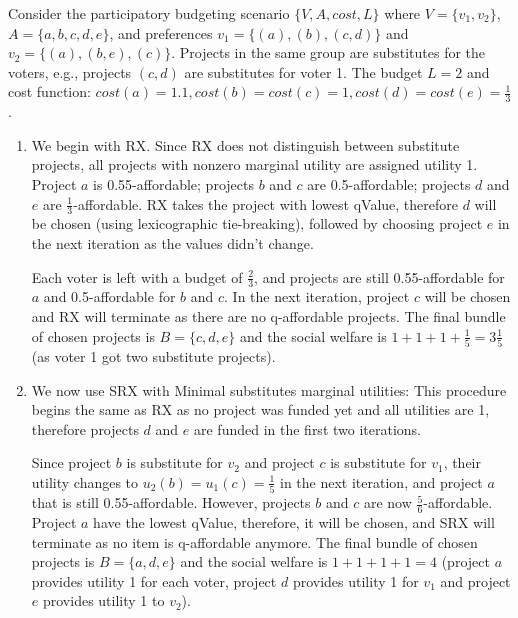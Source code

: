\documentclass[runningheads]{llncs}
\begin{document}
\begin{example}


Consider the 
participatory budgeting scenario $\{V,A,cost,L\}$  where $V=\{v_1,v_2\}$, $A=\{a,b,c,d,e\}$, and preferences $v_1=\{(a),(b),(c,d)\}$ and  $v_2=\{(a),(b,e),(c)\}$. Projects in the same group are  substitutes for the voters, e.g., projects $(c,d)$ are substitutes for voter 1. The budget $L=2$ and cost function: $cost(a)=1.1,cost(b)=cost(c)=1, cost(d)=cost(e)=\frac{1}{3}$. 


\begin{enumerate}
    \item  We begin with RX. Since  RX does not distinguish between substitute projects,   all projects with nonzero marginal utility  are assigned  utility 1.
    Project $a$ is 0.55-affordable; projects $b$ and $c$ are 0.5-affordable; projects $d$ and $e$ are $\frac{1}{3}$-affordable. RX takes the project with lowest qValue, therefore $d$ will be chosen (using lexicographic tie-breaking), followed by choosing project $e$ in the next iteration as the values didn't change.  
    
    Each voter is  left with a budget of $\frac{2}{3}$, and  projects are still 0.55-affordable for $a$ and 0.5-affordable for $b$ and $c$. In the next iteration, project $c$ will be chosen and RX will terminate as there are no  q-affordable projects. The final bundle of chosen projects is  $B=\{c,d,e\}$ and the social welfare is $1+1+1+\frac{1}{5}=3\frac{1}{5}$ (as voter 1 got two substitute projects). 
    
    \item We now use SRX  with Minimal substitutes marginal utilities: This procedure begins  the same as RX as no project was funded yet and all utilities are 1, therefore   projects $d$ and $e$ are funded in the first two iterations. 
    
    Since  project $b$ is substitute for $v_2$ and project $c$ is substitute for $v_1$, their utility changes  to $u_2(b)=u_1(c)=\frac{1}{5}$ in the next iteration, and project $a$ that is  still 0.55-affordable. However, projects $b$ and $c$ are now $\frac{5}{6}$-affordable. Project $a$ have the lowest qValue, therefore, it will be chosen, and SRX will terminate as no item is q-affordable anymore.
    The final bundle of chosen projects is $B=\{a,d,e\}$ and the social welfare is $1+1+1+1=4$ (project $a$ provides utility 1 for each voter, project $d$ provides utility 1 for $v_1$ and project $e$ provides utility 1 to $v_2$).
    

\end{enumerate}
\end{example}
\end{document}
